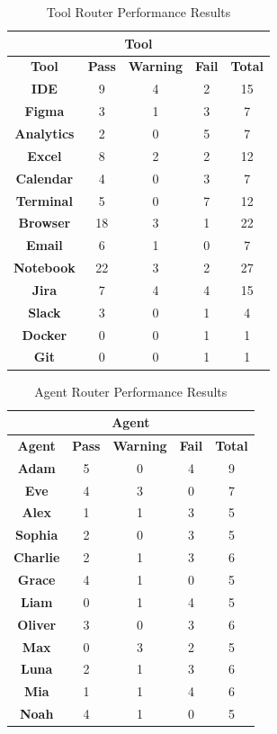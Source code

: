 \begin{table}[H]
    \centering
    \begin{tabular}{|c|c|c|c|c|}
        \hline
        \multicolumn{5}{|c|}{\textbf{Tool}} \\
        \hline
        \textbf{Tool} & \textbf{Pass} & \textbf{Warning} & \textbf{Fail} & \textbf{Total} \\
        \hline
        \textbf{IDE} & 9 & 4 & 2 & 15 \\
        \textbf{Figma} & 3 & 1 & 3 & 7 \\
        \textbf{Analytics} & 2 & 0 & 5 & 7 \\
        \textbf{Excel} & 8 & 2 & 2 & 12 \\
        \textbf{Calendar} & 4 & 0 & 3 & 7 \\
        \textbf{Terminal} & 5 & 0 & 7 & 12 \\
        \textbf{Browser} & 18 & 3 & 1 & 22 \\
        \textbf{Email} & 6 & 1 & 0 & 7 \\
        \textbf{Notebook} & 22 & 3 & 2 & 27 \\
        \textbf{Jira} & 7 & 4 & 4 & 15 \\
        \textbf{Slack} & 3 & 0 & 1 & 4 \\
        \textbf{Docker} & 0 & 0 & 1 & 1 \\
        \textbf{Git} & 0 & 0 & 1 & 1 \\
        \hline
    \end{tabular}
    \caption{Tool Router Performance Results}
    \label{tab:tool-router-results}
\end{table}


\begin{table}[H]
    \centering
    \begin{tabular}{|c|c|c|c|c|}
        \hline
        \multicolumn{5}{|c|}{\textbf{Agent}} \\
        \hline
        \textbf{Agent} & \textbf{Pass} & \textbf{Warning} & \textbf{Fail} & \textbf{Total} \\
        \hline
        \textbf{Adam} & 5 & 0 & 4 & 9 \\
        \textbf{Eve} & 4 & 3 & 0 & 7 \\
        \textbf{Alex} & 1 & 1 & 3 & 5 \\
        \textbf{Sophia} & 2 & 0 & 3 & 5 \\
        \textbf{Charlie} & 2 & 1 & 3 & 6 \\
        \textbf{Grace} & 4 & 1 & 0 & 5 \\
        \textbf{Liam} & 0 & 1 & 4 & 5 \\
        \textbf{Oliver} & 3 & 0 & 3 & 6 \\
        \textbf{Max} & 0 & 3 & 2 & 5 \\
        \textbf{Luna} & 2 & 1 & 3 & 6 \\
        \textbf{Mia} & 1 & 1 & 4 & 6 \\
        \textbf{Noah} & 4 & 1 & 0 & 5 \\
        \hline
    \end{tabular}
\caption{Agent Router Performance Results}
    \label{tab:agent-router-results}
\end{table}


